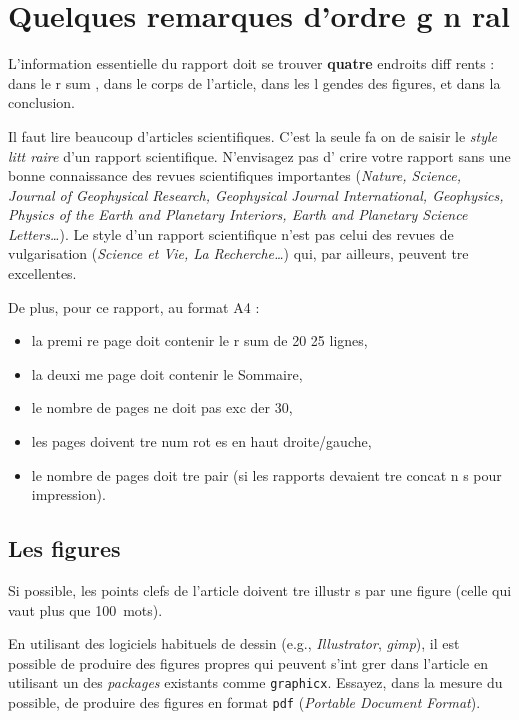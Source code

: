 \documentclass{article}
\begin{document}
\section{Quelques remarques d'ordre g n ral}

L'information essentielle du rapport doit se trouver   {\bfseries quatre} endroits
diff rents : dans le r sum , dans le corps de l'article, dans les 
l gendes des figures, et dans la conclusion.

Il faut lire beaucoup d'articles scientifiques. C'est la seule fa on 
de saisir le \emph{style litt raire\/} d'un rapport scientifique.
N'envisagez pas d' crire votre rapport sans une bonne connaissance des 
revues scientifiques importantes (\emph{Nature, Science, Journal of 
Geo\-phy\-si\-cal Research, Geophysical Journal International, Geophysics, 
Physics of the Earth and Planetary Interiors, Earth and Planetary Science 
Letters\dots\/}). Le style d'un rapport scientifique n'est pas celui des 
revues de vulgarisation (\emph{Science et Vie, La Recherche\dots\/})
qui, par ailleurs, peuvent  tre excellentes.

De plus, pour ce rapport, au format A4 :
\begin{itemize}
\item la premi re page doit contenir le r sum  de 20   25 lignes, 
\item la deuxi me page doit contenir le Sommaire,
\item le nombre de pages ne doit pas exc der 30,
\item les pages doivent  tre  num rot es en haut   droite/gauche,
\item le nombre de pages doit  tre pair (si les rapports devaient  tre concat n s  pour impression).
\end{itemize}

\subsection{Les figures}

Si possible, les points clefs de l'article doivent  tre illustr s par une 
figure (celle qui vaut plus que 100~mots).

En utilisant des logiciels habituels de dessin (e.g., {\sl Illustrator\/}, 
 {\sl gimp\/}), 
il est possible de produire des figures propres qui peuvent s'int grer 
dans l'article en utilisant un des \textit{packages\/} existants 
comme \texttt{graphicx}.
Essayez, dans la mesure du possible, de produire des figures en format 
\texttt{pdf} (\textit{Portable Document Format\/}).
\end{document}
